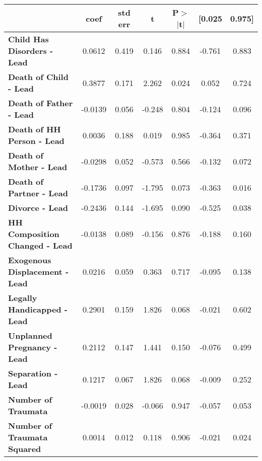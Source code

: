 \begin{center}
\begin{tabular}{lcccccc}
\toprule
                                                                 & \textbf{coef} & \textbf{std err} & \textbf{t} & \textbf{P$>$$|$t$|$} & \textbf{[0.025} & \textbf{0.975]} \\\midrule
\textbf{Child Has Disorders - Lead}                &       0.0612  &        0.419     &     0.146  &         0.884        &       -0.761    &        0.883     \\
\textbf{Death of Child - Lead}                   &       0.3877  &        0.171     &     2.262  &         0.024        &        0.052    &        0.724     \\
\textbf{Death of Father - Lead}                  &      -0.0139  &        0.056     &    -0.248  &         0.804        &       -0.124    &        0.096     \\
\textbf{Death of HH Person - Lead}              &       0.0036  &        0.188     &     0.019  &         0.985        &       -0.364    &        0.371     \\
\textbf{Death of Mother - Lead}                  &      -0.0298  &        0.052     &    -0.573  &         0.566        &       -0.132    &        0.072     \\
\textbf{Death of Partner - Lead}                 &      -0.1736  &        0.097     &    -1.795  &         0.073        &       -0.363    &        0.016     \\
\textbf{Divorce - Lead}                       &      -0.2436  &        0.144     &    -1.695  &         0.090        &       -0.525    &        0.038     \\
\textbf{HH Composition Changed - Lead}               &      -0.0138  &        0.089     &    -0.156  &         0.876        &       -0.188    &        0.160     \\
\textbf{Exogenous Displacement - Lead}      &       0.0216  &        0.059     &     0.363  &         0.717        &       -0.095    &        0.138     \\
\textbf{Legally Handicapped - Lead}     &       0.2901  &        0.159     &     1.826  &         0.068        &       -0.021    &        0.602     \\
\textbf{Unplanned Pregnancy - Lead}           &       0.2112  &        0.147     &     1.441  &         0.150        &       -0.076    &        0.499     \\
\textbf{Separation - Lead}                      &       0.1217  &        0.067     &     1.826  &         0.068        &       -0.009    &        0.252     \\
\textbf{Number of Traumata}                                      &      -0.0019  &        0.028     &    -0.066  &         0.947        &       -0.057    &        0.053     \\
\textbf{Number of Traumata Squared}                         &       0.0014  &        0.012     &     0.118  &         0.906        &       -0.021    &        0.024     \\
\bottomrule
\end{tabular}
\end{center}